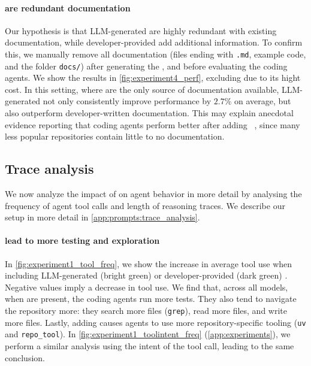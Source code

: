\paragraph{\Agentsmds{} are redundant documentation}
Our hypothesis is that LLM-generated \agentsmds{} are highly redundant with existing documentation, while developer-provided \agentsmds{} add additional information.
To confirm this, we manually remove all documentation (files ending with \texttt{.md}, example code, and the folder \texttt{docs/}) after generating the \agentsmd{}, and before evaluating the coding agents. We show the results in \cref{fig:experiment4_perf}, excluding \claudecode{} due to its hight cost.
In this setting, where \agentsmds{} are the only source of documentation available, LLM-generated \agentsmds{} not only consistently improve performance by $2.7$\% on average, but also outperform developer-written documentation.
This may explain anecdotal evidence reporting that coding agents perform better after adding \agentsmds{}~\citep{builderioImproveYourAICodeOutputWithAgentsMd}, since many less popular repositories contain little to no documentation.


\subsection{Trace analysis}
\label{sec:eval:trace}

We now analyze the impact of \agentsmds{} on agent behavior in more detail by analysing the frequency of agent tool calls and length of reasoning traces. We describe our setup in more detail in \cref{app:prompts:trace_analysis}.


\paragraph{\Agentsmds{} lead to more testing and exploration}
In \cref{fig:experiment1_tool_freq}, we show the increase in average tool use when including LLM-generated (bright green) or developer-provided (dark green) \agentsmds{}. Negative values imply a decrease in tool use. We find that, across all models, when \agentsmds{} are present, the coding agents run more tests.
They also tend to navigate the repository more: they search more files (\texttt{grep}), read more files, and write more files.
Lastly, adding \agentsmds{} causes agents to use more repository-specific tooling (\eg \texttt{uv} and \texttt{repo\_tool}).
In \cref{fig:experiment1_toolintent_freq} (\cref{app:experiments}), we perform a similar analysis using the intent of the tool call, leading to the same conclusion.

